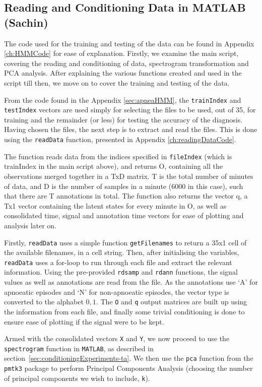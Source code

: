 \subsection{Reading and Conditioning Data in MATLAB (Sachin)}
\label{sec:RandCDatainMATLAB}

The code used for the training and testing of the data can be found in Appendix \ref{ch:HMMCode} for ease of explanation. Firstly, we examine the main script, covering the reading and conditioning of data, spectrogram transformation and PCA analysis. After explaining the various functions created and used in the script till then, we move on to cover the training and testing of the data.

From the code found in the Appendix \ref{sec:apneaHMM}, the \verb!trainIndex! and \verb!testIndex! vectors are used simply for selecting the files to be used, out of 35, for training and the remainder (or less) for testing the accuracy of the diagnosis. Having chosen the files, the next step is to extract and read the files. This is done using the \verb!readData! function, presented in Appendix \ref{ch:readingDataCode}.

The function reads data from the indices specified in \verb!fileIndex! (which is trainIndex in the main script above), and returns O, containing all the observations merged together in a TxD matrix. T is the total number of minutes of data, and D is the number of samples in a minute (6000 in this case), such that there are T annotations in total. The function also returns the vector q, a Tx1 vector containing the latent states for every minute in O, as well as consolidated time, signal and annotation time vectors for ease of plotting and analysis later on.

Firstly, \verb!readData! uses a simple function \verb!getFilenames! to return a 35x1 cell of the available filenames, in a cell string. Then, after initialising the variables, \verb!readData! uses a for-loop to run through each file and extract the relevant information. Using the pre-provided \verb!rdsamp! and \verb!rdann! functions, the signal values as well as annotations are read from the file. As the annotations use `A' for apnoeatic episodes and `N' for non-apnoeatic episodes, the vector type is converted to the alphabet ${0,1}$. The \verb!O! and \verb!q! output matrices are built up using the information from each file, and finally some trivial conditioning is done to ensure ease of plotting if the signal were to be kept.

Armed with the consolidated vectors \verb!X! and \verb!Y!, we now proceed to use the \verb!spectrogram! function in \verb!MATLAB!\textsuperscript{\textregistered}, as described in section~\ref{sec:conditioningExperiments-ta}. We then use the \verb!pca! function from the \verb!pmtk3! package to perform Principal Components Analysis (choosing the number of principal components we wish to include, \verb!k!). 